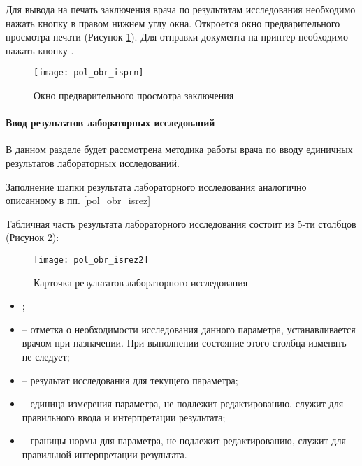 
Для вывода на печать заключения врача по результатам исследования необходимо нажать кнопку  в правом нижнем углу окна. Откроется окно предварительного просмотра печати (Рисунок \ref{img_pol_obr_isprn}). Для отправки документа на принтер необходимо нажать кнопку .

 \begin{figure}[ht]\centering
   \texttt{[image: pol\_obr\_isprn]}
   \caption{Окно предварительного просмотра заключения}
   \label{img_pol_obr_isprn}
 \end{figure}

\paragraph{Ввод результатов лабораторных исследований} \label{pol_obr_rez}
 
В данном разделе будет рассмотрена методика работы врача по вводу единичных результатов лабораторных исследований.

Заполнение шапки результата лабораторного исследования аналогично описанному в пп. \ref{pol_obr_isrez}

Табличная часть результата лабораторного исследования состоит из 5-ти столбцов (Рисунок \ref{img_pol_obr_isrez2}):

 \begin{figure}[ht]\centering
   \texttt{[image: pol\_obr\_isrez2]}
   \caption{Карточка результатов лабораторного исследования}
   \label{img_pol_obr_isrez2}
 \end{figure}
 
\begin{itemize}
 \item {};
 \item {} – отметка о необходимости исследования данного параметра, устанавливается врачом при назначении. При выполнении состояние этого столбца изменять не следует;
 \item {} – результат исследования для текущего параметра;
 \item {} – единица измерения параметра, не подлежит редактированию, служит для правильного ввода и интерпретации результата;
 \item {} – границы нормы для параметра, не подлежит редактированию, служит для правильной интерпретации результата.
\end{itemize}

